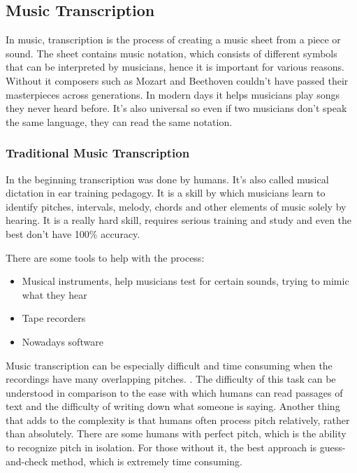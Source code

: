 \subsection{Music Transcription}
In music, transcription is the process of creating a music sheet from a piece or sound. The sheet contains music notation, which consists of different symbols that can be interpreted by musicians, hence it is important for various reasons. Without it composers such as Mozart and Beethoven couldn't have passed their masterpieces across generations. In modern days it helps musicians play songs they never heard before. It's also universal so even if two musicians don't speak the same language, they can read the same notation.

\subsubsection{Traditional Music Transcription}
In the beginning transcription was done by humans. It's also called musical dictation in ear training pedagogy. \cite{human_transcription} It is a skill by which musicians learn to identify pitches, intervals, melody, chords and other elements of music solely by hearing. It is a really hard skill, requires serious training and study and even the best don't have 100\% accuracy. \par

There are some tools to help with the process:
\begin{itemize}
	\item Musical instruments, help musicians test for certain sounds, trying to mimic what they hear
	\item Tape recorders
	\item Nowadays software
\end{itemize}
\par

Music transcription can be especially difficult and time consuming when the recordings have many overlapping pitches.
\cite{music_retrieval}. The difficulty of this task can be understood in comparison to the ease with which humans can read passages of text and the difficulty of writing down what someone is saying. Another thing that adds to the complexity is that humans often process pitch relatively, rather than absolutely. There are some humans with perfect pitch, which is the ability to recognize pitch in isolation. For those without it, the best approach is guess-and-check method, which is extremely time consuming.

